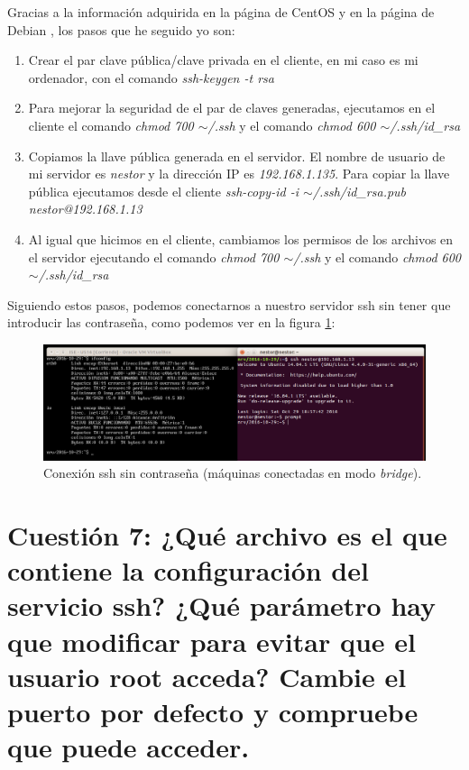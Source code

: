 \documentclass[a4paper,titlepage,12pt]{scrartcl}	%
\numberwithin{figure}{section} %
\numberwithin{table}{section} %
\begin{document}
	Gracias a la información adquirida en la página de CentOS \cite{sshwithoutpswcentos} y en la página de Debian \cite{sshwithoutpswdebian}, los pasos que he seguido yo son:
	
	\begin{enumerate}
		\item Crear el par clave pública/clave privada en el cliente, en mi caso es mi ordenador, con el comando \textit{ssh-keygen -t rsa}
		\item Para mejorar la seguridad de el par de claves generadas, ejecutamos en el cliente el comando \textit{chmod 700 $\sim$/.ssh} y el comando \textit{chmod 600 $\sim$/.ssh/id\_rsa}
		\item Copiamos la llave pública generada en el servidor. El nombre de usuario de mi servidor es \textit{nestor} y la dirección IP es \textit{192.168.1.135}. Para copiar la llave pública ejecutamos desde el cliente \textit{ssh-copy-id -i $\sim$/.ssh/id\_rsa.pub nestor@192.168.1.13}
		\item Al igual que hicimos en el cliente, cambiamos los permisos de los archivos en el servidor ejecutando el comando \textit{chmod 700 $\sim$/.ssh} y el comando \textit{chmod 600 $\sim$/.ssh/id\_rsa}
	\end{enumerate}
	
	Siguiendo estos pasos, podemos conectarnos a nuestro servidor ssh sin tener que introducir las contraseña, como podemos ver en la figura \ref{6-ssh}:
	
	\begin{figure}[H]
		\includegraphics[width=\linewidth]{./Imagenes/6-ssh.png}
		\vspace{-0.5cm}
		\caption[Conexión ssh sin contraseña (máquinas conectadas en modo \textit{bridge}).]{Conexión ssh sin contraseña (máquinas conectadas en modo \textit{bridge}).}
		\label{6-ssh}
	\end{figure}
	
	\section[Cuestión 7: ¿Qué archivo es el que contiene la configuración del servicio ssh? ¿Qué parámetro hay que modificar para evitar que el usuario root acceda? Cambie el puerto por defecto y compruebe que puede acceder.]{Cuestión 7: ¿Qué archivo es el que contiene la configuración del servicio ssh? ¿Qué parámetro hay que modificar para evitar que el usuario root acceda? Cambie el puerto por defecto y compruebe que puede acceder.}
	
\end{document}
